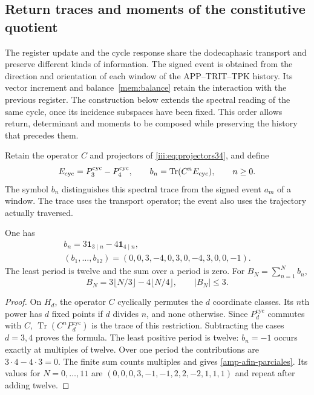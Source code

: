 \subsection{Return traces and moments of the constitutive quotient}
\label{amp-afin-sec}

The register update and the cycle response share the dodecaphasic
transport and preserve different kinds of information.
The signed event is obtained from the direction and orientation of each
window of the APP--TRIT--TPK history. Its vector increment and
balance~\eqref{mem:balance} retain the interaction with the previous
register. The construction below extends the spectral reading of the
same cycle, once its incidence subspaces have been fixed. This order
allows return, determinant and moments to be composed while preserving
the history that precedes them.

Retain the operator $C$ and projectors of
\eqref{iii:eq:projectors34}, and define
\begin{equation}
 E_{\rm cyc}=P_3^{\mathrm{cyc}}-P_4^{\mathrm{cyc}},\qquad
 b_n=\operatorname{Tr}(C^n E_{\rm cyc}),\qquad n\geq0.
 \label{amp-afin-trazas}
\end{equation}
The symbol $b_n$ distinguishes this spectral trace from the signed
event $a_m$ of a window. The trace uses the transport operator; the
event also uses the trajectory actually traversed.

\begin{proposition}
\label{amp-afin-prop-tabla}
One has
\begin{equation}
 \begin{gathered}
 b_n=3\mathbf1_{3\mid n}-4\mathbf1_{4\mid n},\\
 (b_1,\ldots,b_{12})=(0,0,3,-4,0,3,0,-4,3,0,0,-1).
 \end{gathered}
 \label{amp-afin-tabla}
\end{equation}
The least period is twelve and the sum over a period is zero. For
$B_N=\sum_{n=1}^{N}b_n$,
\begin{equation}
 B_N=3\lfloor N/3\rfloor-4\lfloor N/4\rfloor,\qquad |B_N|\leq3.
 \label{amp-afin-parciales}
\end{equation}
\end{proposition}
\begin{proof}
On $H_d$, the operator $C$ cyclically permutes the $d$ coordinate
classes. Its $n$th power has $d$ fixed points if $d$ divides $n$,
and none otherwise. Since $P_d^{\mathrm{cyc}}$ commutes with $C$,
$\operatorname{Tr}(C^nP_d^{\mathrm{cyc}})$ is the trace of this
restriction. Subtracting the cases $d=3,4$ proves the formula.
The least positive period is twelve: $b_n=-1$ occurs exactly at
multiples of twelve. Over one period the contributions are
$3\cdot4-4\cdot3=0$. The finite sum counts multiples and gives
\eqref{amp-afin-parciales}. Its values for $N=0,\ldots,11$ are
$(0,0,0,3,-1,-1,2,2,-2,1,1,1)$ and repeat after adding twelve.
\end{proof}


